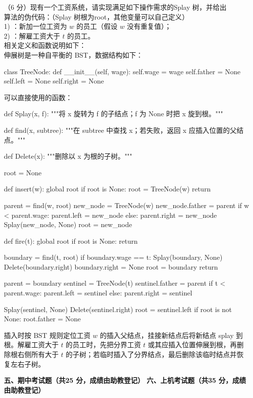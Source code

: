 \begin{question}
（6 分）现有一个工资系统，请实现满足如下操作需求的Splay 树，并给出\\
算法的伪代码：（Splay 树根为root，其他变量可以自己定义）\\
1) \texttt{}：新加一位工资为 $w$ 的员工（假设 $w$ 没有重复值）；\\
2) \texttt{}：解雇工资大于 $t$ 的员工。\\
相关定义和函数说明如下：\\
伸展树是一种自平衡的 BST，数据结构如下：
\begin{pycode}
class TreeNode:
    def __init__(self, wage):
        self.wage = wage
        self.father = None
        self.left = None
        self.right = None
\end{pycode}
可以直接使用的函数：
\begin{pycode}
def Splay(x, f):
    """将 x 旋转为 f 的子结点；f 为 None 时把 x 旋到根。"""


def find(x, subtree):
    """在 subtree 中查找 x；若失败，返回 x 应插入位置的父结点。"""


def Delete(x):
    """删除以 x 为根的子树。"""


root = None


def insert(w):
    global root
    if root is None:
        root = TreeNode(w)
        return

    parent = find(w, root)
    new_node = TreeNode(w)
    new_node.father = parent
    if w < parent.wage:
        parent.left = new_node
    else:
        parent.right = new_node
    Splay(new_node, None)
    root = new_node


def fire(t):
    global root
    if root is None:
        return

    boundary = find(t, root)
    if boundary.wage == t:
        Splay(boundary, None)
        Delete(boundary.right)
        boundary.right = None
        root = boundary
        return

    parent = boundary
    sentinel = TreeNode(t)
    sentinel.father = parent
    if t < parent.wage:
        parent.left = sentinel
    else:
        parent.right = sentinel

    Splay(sentinel, None)
    Delete(sentinel.right)
    root = sentinel.left
    if root is not None:
        root.father = None
\end{pycode}

\begin{solution}
插入时按 BST 规则定位工资 $w$ 的插入父结点，挂接新结点后将新结点 splay 到根。解雇工资大于 $t$ 的员工时，先把分界工资 $t$ 或其应插入位置伸展到根，再删除根右侧所有大于 $t$ 的子树；若临时插入了分界结点，最后删除该临时结点并恢复左右子树。
\end{solution}
\end{question}

\textbf{五、期中考试题（共25 分，成绩由助教登记）}
\textbf{六、上机考试题（共35 分，成绩由助教登记）}
